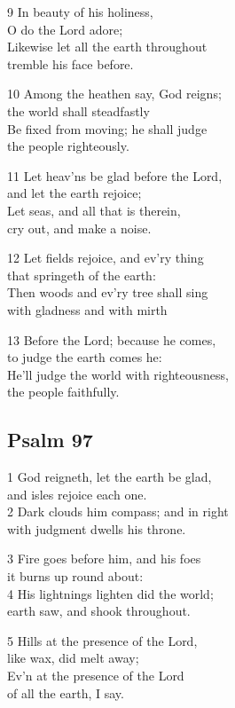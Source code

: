 9 In beauty of his holiness,\\
O do the Lord adore;\\
Likewise let all the earth throughout\\
tremble his face before.

10 Among the heathen say, God reigns;\\
the world shall steadfastly\\
Be fixed from moving; he shall judge\\
the people righteously.

11 Let heav’ns be glad before the Lord,\\
and let the earth rejoice;\\
Let seas, and all that is therein,\\
cry out, and make a noise.

12 Let fields rejoice, and ev’ry thing\\
that springeth of the earth:\\
Then woods and ev’ry tree shall sing\\
with gladness and with mirth

13 Before the Lord; because he comes,\\
to judge the earth comes he:\\
He’ll judge the world with righteousness,\\
the people faithfully.

\begin{center}
\quad{}\quad{}
\end{center}

\subsection*{Psalm 97}

1 God reigneth, let the earth be glad,\\
and isles rejoice each one.\\
2 Dark clouds him compass; and in right\\
with judgment dwells his throne.

3 Fire goes before him, and his foes\\
it burns up round about:\\
4 His lightnings lighten did the world;\\
earth saw, and shook throughout.

5 Hills at the presence of the Lord,\\
like wax, did melt away;\\
Ev’n at the presence of the Lord\\
of all the earth, I say.

